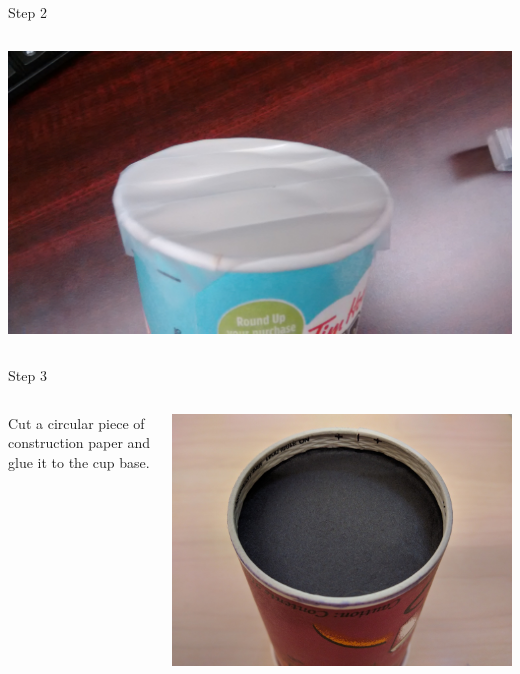 \begin{frame}{Step 2}
\begin{columns}
\begin{column}{0.4\textwidth}
      \includegraphics[width=\textwidth,trim=4in 0 4in 0,clip]{media/coveredlid1.jpg}
    \end{column}
  \end{columns}
\end{frame}

\begin{frame}{Step 3}
  \begin{columns}
    \begin{column}{0.6\textwidth}
      Cut a circular piece of construction paper and glue it to the cup base.
    \end{column}
    \begin{column}{0.4\textwidth}
      \includegraphics[width=\textwidth]{media/cup-without-pin.jpg}
    \end{column}
  \end{columns}
  
\end{frame}

